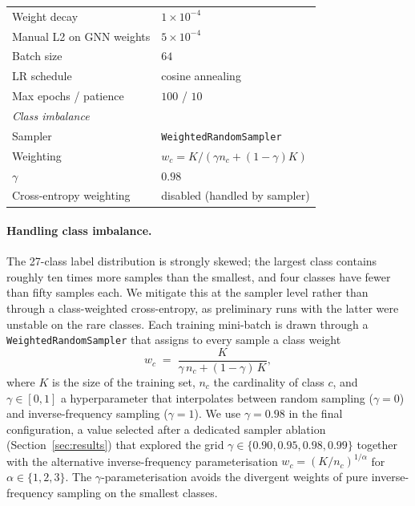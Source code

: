 \documentclass[review,3p,times,11pt, ]{elsarticle} %
\begin{document}
\begin{table}[!t]
\begin{tabular}{ll}
\quad Weight decay                  & $1 \times 10^{-4}$ \\
\quad Manual L2 on GNN weights      & $5 \times 10^{-4}$ \\
\quad Batch size                    & $64$ \\
\quad LR schedule                   & cosine annealing \\
\quad Max epochs / patience         & $100$ / $10$ \\
\midrule
\multicolumn{2}{l}{\textit{Class imbalance}} \\
\quad Sampler                       & \texttt{WeightedRandomSampler} \\
\quad Weighting                     & $w_c = K/(\gamma n_c + (1-\gamma)K)$ \\
\quad $\gamma$                      & $0.98$ \\
\quad Cross-entropy weighting       & disabled (handled by sampler) \\
\bottomrule
\end{tabular}
\end{table}

\paragraph{Handling class imbalance.}
The 27-class label distribution is strongly skewed; the largest class
contains roughly ten times more samples than the smallest, and four
classes have fewer than fifty samples each. We mitigate this at the
sampler level rather than through a class-weighted cross-entropy, as
preliminary runs with the latter were unstable on the rare classes.
Each training mini-batch is drawn through a
\texttt{WeightedRandomSampler} that assigns to every sample a class
weight
%
\begin{equation}
    w_c \;=\; \frac{K}{\gamma\, n_c + (1-\gamma)\, K},
    \label{eq:gamma_weights}
\end{equation}
%
where $K$ is the size of the training set, $n_c$ the cardinality of
class $c$, and $\gamma \in [0,1]$ a hyperparameter that interpolates
between random sampling ($\gamma = 0$) and inverse-frequency sampling
($\gamma = 1$). We use $\gamma = 0.98$ in the final configuration, a
value selected after a dedicated sampler ablation
(Section~\ref{sec:results}) that explored the grid
$\gamma \in \{0.90, 0.95, 0.98, 0.99\}$ together with the alternative
inverse-frequency parameterisation
$w_c = (K/n_c)^{1/\alpha}$ for $\alpha \in \{1, 2, 3\}$. The
$\gamma$-parameterisation avoids the divergent weights of pure
inverse-frequency sampling on the smallest classes.
\end{document}
